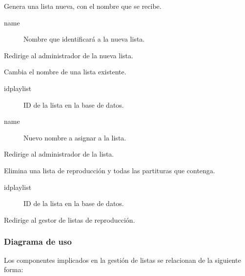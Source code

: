 \begin{description}[style=nextline]
	\item[new\_playlist (name)]
	Genera una lista nueva, con el nombre que se recibe. 
	
	\begin{description}
		\item[name] Nombre que identificará a la nueva lista.
	\end{description}
	
	Redirige al administrador de la nueva lista.
	
	\item[rename\_playlist (idplaylist, name)]
	Cambia el nombre de una lista existente.
	
	\begin{description}
		\item[idplaylist] ID de la lista en la base de datos.
		\item[name] Nuevo nombre a asignar a la lista.
	\end{description}
	
	Redirige al administrador de la lista.
	
	\item[delete\_playlist (idplaylist)]
	Elimina una lista de reproducción y todas las partituras que contenga.
	
	\begin{description}
		\item[idplaylist] ID de la lista en la base de datos.
	\end{description}
	
	Redirige al gestor de listas de reproducción.
	
\end{description}

\subsubsection{Diagrama de uso}

Los componentes implicados en la gestión de listas se relacionan de la siguiente forma:

\smallskip

